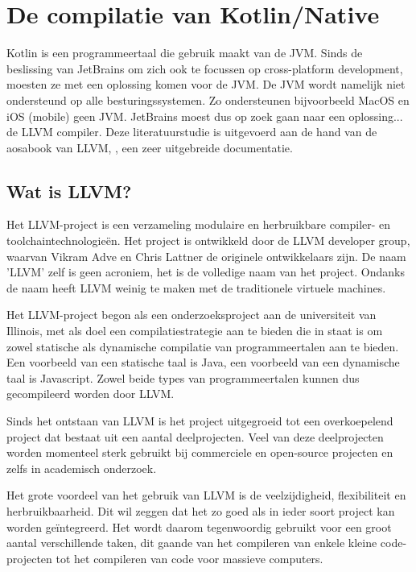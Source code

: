 
\chapter{De compilatie van Kotlin/Native}
\label{ch:compiler}
Kotlin is een programmeertaal die gebruik maakt van de JVM. Sinds de beslissing van JetBrains om zich ook te focussen op cross-platform development, moesten ze met een oplossing komen voor de JVM. De JVM wordt namelijk niet ondersteund op alle besturingssystemen. Zo ondersteunen bijvoorbeeld MacOS en iOS (mobile) geen JVM. JetBrains moest dus op zoek gaan naar een oplossing... de LLVM compiler. Deze literatuurstudie is uitgevoerd aan de hand van de aosabook van LLVM, \textcite{aosa}, een zeer uitgebreide documentatie. 

\section{Wat is LLVM?}
Het LLVM-project is een verzameling modulaire en herbruikbare compiler- en toolchaintechnologieën. Het project is ontwikkeld door de LLVM developer group, waarvan Vikram Adve en Chris Lattner de originele ontwikkelaars zijn. De naam 'LLVM' zelf is geen acroniem, het is de volledige naam van het project. Ondanks de naam heeft LLVM weinig te maken met de traditionele virtuele machines.

Het LLVM-project begon als een onderzoeksproject aan de universiteit van Illinois, met als doel een compilatiestrategie aan te bieden die in staat is om zowel statische als dynamische compilatie van programmeertalen aan te bieden. Een voorbeeld van een statische taal is Java, een voorbeeld van een dynamische taal is Javascript. Zowel beide types van programmeertalen kunnen dus gecompileerd worden door LLVM.

Sinds het ontstaan van LLVM is het project uitgegroeid tot een overkoepelend project dat bestaat uit een aantal deelprojecten. Veel van deze deelprojecten worden momenteel sterk gebruikt bij commerciele en open-source projecten en zelfs in academisch onderzoek.

Het grote voordeel van het gebruik van LLVM is de veelzijdigheid, flexibiliteit en herbruikbaarheid. Dit wil zeggen dat het zo goed als in ieder soort project kan worden geïntegreerd. Het wordt daarom tegenwoordig gebruikt voor een groot aantal verschillende taken, dit gaande van het compileren van enkele kleine code-projecten tot het compileren van code voor massieve computers.

